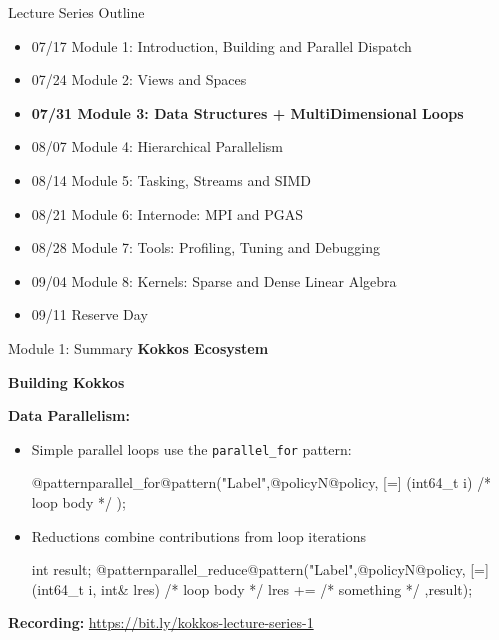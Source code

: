 \begin{frame}{Lecture Series Outline}

\begin{itemize}
        \item 07/17 Module 1: Introduction, Building and Parallel Dispatch
        \item 07/24 Module 2: Views and Spaces
	\item \textbf{07/31 Module 3: Data Structures + MultiDimensional Loops}
        \item 08/07 Module 4: Hierarchical Parallelism
        \item 08/14 Module 5: Tasking, Streams and SIMD
        \item 08/21 Module 6: Internode: MPI and PGAS
        \item 08/28 Module 7: Tools: Profiling, Tuning and Debugging
        \item 09/04 Module 8: Kernels: Sparse and Dense Linear Algebra
        \item 09/11 Reserve Day
\end{itemize}
\end{frame}

\begin{frame}[fragile]{Module 1: Summary}
	\textbf{Kokkos Ecosystem}

	\textbf{Building Kokkos}

	\textbf{Data Parallelism:}

	\begin{itemize}
		\item Simple parallel loops use the \texttt{parallel\_for} pattern:
\begin{code}[linebackgroundcolor={\btLstHL<1->{3}{bodyColor}},frame=single]
@patternparallel_for@pattern("Label",@policyN@policy, [=] (int64_t i) {
  /* loop body */
});
\end{code}
\item Reductions combine contributions from loop iterations
\begin{code}[linebackgroundcolor={\btLstHL<1->{3}{bodyColor}},frame=single]
int result;
@patternparallel_reduce@pattern("Label",@policyN@policy, [=] (int64_t i, int& lres) {
   /* loop body */
    lres += /* something */
  },result);
\end{code}

\end{itemize}

	\textbf{Recording:} \url{https://bit.ly/kokkos-lecture-series-1}

\end{frame}



